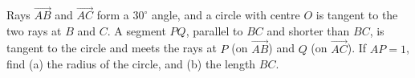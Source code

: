 Rays $\overrightarrow{AB}$ and $\overrightarrow{AC}$ form a $30^\circ$ angle, and a circle with centre $O$ is tangent to the two rays at $B$ and $C$. A segment $PQ$, parallel to $BC$ and shorter than $BC$, is tangent to the circle and meets the rays at $P$ (on $\overrightarrow{AB}$) and $Q$ (on $\overrightarrow{AC}$). If $AP=1$, find (a) the radius of the circle, and (b) the length $BC$.
